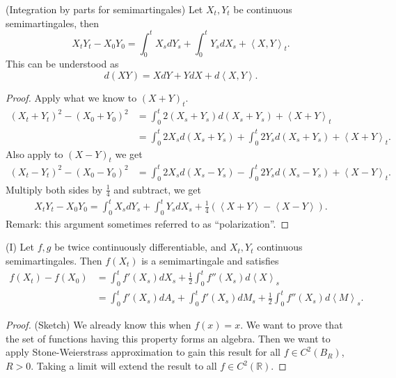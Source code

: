\begin{proposition}
	(Integration by parts for semimartingales)
	Let $X_t, Y_t$ be continuous semimartingales, then
	\[
		X_t Y_t - X_0 Y_0 = \int _0^t X_s d Y_s + \int _0^t Y_s d X_s + \left\langle X, Y \right\rangle _t
	.\] 
	This can be understood as
	\[
		d(XY) = X dY + Y d X + d\left\langle X, Y \right\rangle 
	.\] 
\end{proposition}
\begin{proof}
	Apply what we know to $(X + Y)_t$.
	\begin{align*}
		(X_t + Y_t)^2 - (X_0 + Y_0)^2
		&= \int _0^t 2\left( X_s + Y_s \right) d (X_s + Y_s) + \left\langle X + Y \right\rangle _t\\
		&= \int _0^t 2X_s d (X_s + Y_s) + \int _0^t 2Y_s d (X_s + Y_s) +\left\langle X+ Y \right\rangle _t
	.\end{align*} 
	Also apply to  $(X - Y)_t$ we get
\begin{align*}
		(X_t - Y_t)^2 - (X_0 - Y_0)^2
		&= \int _0^t 2X_s d (X_s - Y_s) - \int _0^t 2Y_s d (X_s - Y_s) +\left\langle X - Y \right\rangle _t
	.\end{align*}
	Multiply both sides by $\frac{1}{4}$ and subtract, we get
	\begin{align*}
		X_t Y_t - X_0 Y_0 = \int _0^t X_s d Y_s+  \int _0^t Y_s d X_s + \frac{1}{4} \left( \left\langle X + Y \right\rangle  - \left\langle X - Y \right\rangle  \right) 
	.\end{align*}
	Remark: this argument sometimes referred to as ``polarization''. 
\end{proof}

\begin{theorem}(I)
	Let $f, g$ be twice continuously differentiable, and $X_t, Y_t$ continuous semimartingales. Then $f(X_t)$ is a semimartingale and satisfies
	\begin{align*}
		f(X_t) - f(X_0) 
		&= \int _0^t f'(X_s) d X_s + \frac{1}{2} \int _0^t f''(X_s) d\left\langle X \right\rangle _s\\
		&= \int _0^t f'(X_s) d A_s + \int _0^t f'(X_s) d M_s + \frac{1}{2 }\int _0^t f''(X_s) d \left\langle M \right\rangle _s 
	.\end{align*} 
\end{theorem}
\begin{proof}
	(Sketch)
	We already know this when  $f(x) = x$. We want to prove that the set of functions having this property forms an algebra. Then we want to apply Stone-Weierstrass approximation to gain this result for all $f \in  C^2(B_R)$, $R > 0$. Taking a limit will extend the result to all $f \in C^2(\mathbb{R})$.
\end{proof}

